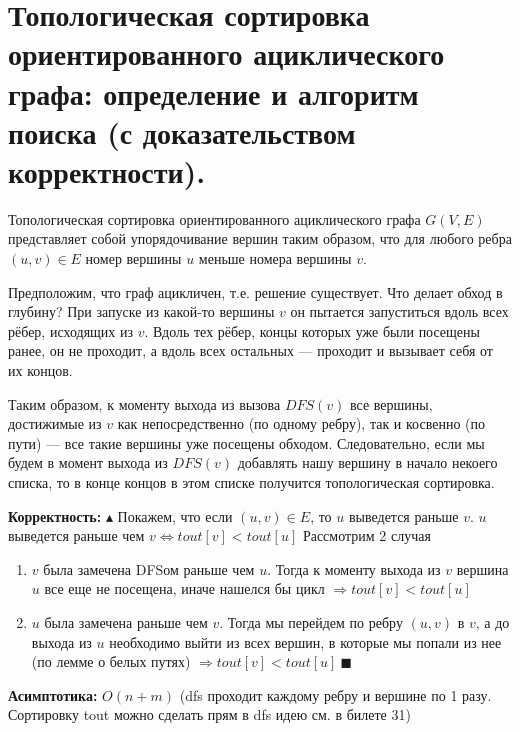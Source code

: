 \setcounter{section}{28}
\section{Топологическая сортировка ориентированного ациклического графа: определение и алгоритм поиска (с доказательством корректности).}
\par Топологическая сортировка ориентированного ациклического графа $G(V,E)$ представляет собой упорядочивание вершин таким образом, что для любого ребра $(u,v) \in E$ номер вершины $u$ меньше номера вершины $v$.
\par Предположим, что граф ацикличен, т.е. решение существует. Что делает обход в глубину? При запуске из какой-то вершины $v$ он пытается запуститься вдоль всех рёбер, исходящих из $v$. Вдоль тех рёбер, концы которых уже были посещены ранее, он не проходит, а вдоль всех остальных — проходит и вызывает себя от их концов.
\par Таким образом, к моменту выхода из вызова $DFS(v)$ все вершины, достижимые из $v$ как непосредственно (по одному ребру), так и косвенно (по пути) — все такие вершины уже посещены обходом. Следовательно, если мы будем в момент выхода из $DFS(v)$ добавлять нашу вершину в начало некоего списка, то в конце концов в этом списке получится топологическая сортировка.

\par \textbf{Корректность:} $\blacktriangle$ Покажем, что если $(u,v) \in E$, то $u$ выведется раньше $v$. $u$ выведется раньше чем $v \Leftrightarrow tout[v]<tout[u]$ Рассмотрим 2 случая
\begin{enumerate}
    \item $v$ была замечена DFSом раньше чем $u$. Тогда к моменту выхода из $v$ вершина $u$ все еще не посещена, иначе нашелся бы цикл $\Rightarrow tout[v]<tout[u]$
    \item $u$ была замечена раньше чем $v$. Тогда мы перейдем по ребру $(u,v)$ в $v$, а до выхода из $u$ необходимо выйти из всех вершин, в которые мы попали из нее (по лемме о белых путях) $\Rightarrow tout[v]<tout[u] \: \blacksquare$
\end{enumerate}
\par \textbf{Асимптотика:} $O(n+m)$ (dfs проходит каждому ребру и вершине по 1 разу. Сортировку tout можно сделать прям в dfs идею см. в билете 31)

\setcounter{section}{29}
